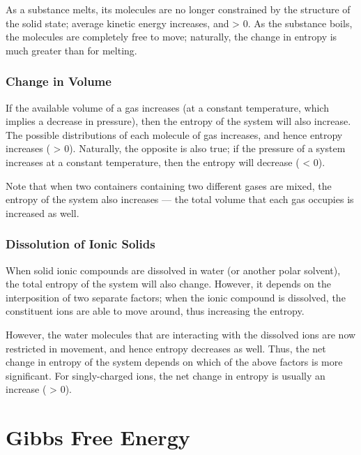 				As a substance melts, its molecules are no longer constrained by the structure of the solid state; average kinetic energy increases,
				and \entr{} > 0. As the substance boils, the molecules are completely free to move; naturally, the change in entropy is much greater
				than for melting.


			\subsubsection{Change in Volume}

				If the available volume of a gas increases (at a constant temperature, which implies a decrease in pressure), then the entropy
				of the system will also increase. The possible distributions of each molecule of gas increases, and hence entropy increases
				(\entr{} > 0). Naturally, the opposite is also true; if the pressure of a system increases at a constant temperature, then the entropy
				will decrease (\entr{} < 0).

				Note that when two containers containing two different gases are mixed, the entropy of the system also increases --- the total
				volume that each gas occupies is increased as well.



			\subsubsection{Dissolution of Ionic Solids}

				When solid ionic compounds are dissolved in water (or another polar solvent), the total entropy of the system will also change.
				However, it depends on the interposition of two separate factors; when the ionic compound is dissolved, the constituent ions are
				able to move around, thus increasing the entropy.

				However, the water molecules that are interacting with the dissolved ions are now restricted in movement, and hence entropy decreases
				as well. Thus, the net change in entropy of the system depends on which of the above factors is more significant. For singly-charged
				ions, the net change in entropy is usually an increase (\entr{} > 0).


	\pagebreak
	\section{Gibbs Free Energy}

